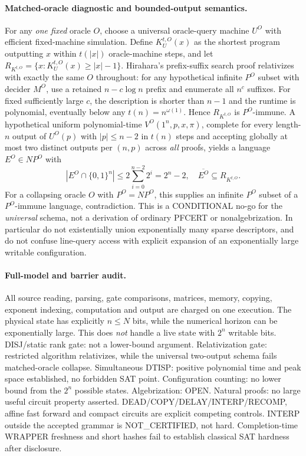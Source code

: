 \documentclass[11pt]{article}
\begin{document}
\paragraph{Matched-oracle diagnostic and bounded-output semantics.}
For any \emph{one fixed} oracle $O$, choose a universal oracle-query machine $U^O$ with efficient fixed-machine simulation. Define $K_{U}^{t,O}(x)$ as the shortest program outputting $x$ within $t(|x|)$ oracle-machine steps, and let $R_{K^{t,O}}=\{x:K_{U}^{t,O}(x)\ge |x|-1\}$. Hirahara's prefix-suffix search proof relativizes with exactly the same $O$ throughout: for any hypothetical infinite $P^O$ subset with decider $M^O$, use a retained $n-c\log n$ prefix and enumerate all $n^c$ suffixes. For fixed sufficiently large $c$, the description is shorter than $n-1$ and the runtime is polynomial, eventually below any $t(n)=n^{\omega(1)}$. Hence $R_{K^{t,O}}$ is $P^O$-immune. A hypothetical uniform polynomial-time $V^O(1^n,p,x,\pi)$, complete for every length-$n$ output of $U^O(p)$ with $|p|\le n-2$ in $t(n)$ steps and accepting globally at most two distinct outputs per $(n,p)$ across \emph{all} proofs, yields a language $E^O\in NP^O$ with
\[
|E^O\cap\{0,1\}^n|\le2\sum_{i=0}^{n-2}2^i=2^n-2,\quad
\overline{E^O}\subseteq R_{K^{t,O}}.
\]
For a collapsing oracle $O$ with $P^O=NP^O$, this supplies an infinite $P^O$ subset of a $P^O$-immune language, contradiction. This is a CONDITIONAL no-go for the \emph{universal} schema, not a derivation of ordinary PFCERT or nonalgebrization. In particular do not existentially union exponentially many sparse descriptors, and do not confuse line-query access with explicit expansion of an exponentially large writable configuration.

\paragraph{Full-model and barrier audit.}
All source reading, parsing, gate comparisons, matrices, memory, copying, exponent indexing, computation and output are charged on one execution. The physical state has explicitly $n\le N$ bits, while the numerical horizon can be exponentially large. This does \emph{not} handle a live state with $2^n$ writable bits. DISJ/static rank gate: not a lower-bound argument. Relativization gate: restricted algorithm relativizes, while the universal two-output schema fails matched-oracle collapse. Simultaneous DTISP: positive polynomial time and peak space established, no forbidden SAT point. Configuration counting: no lower bound from the $2^n$ possible states. Algebrization: OPEN. Natural proofs: no large useful circuit property asserted. DEAD/COPY/DELAY/INTERP/RECOMP, affine fast forward and compact circuits are explicit competing controls. INTERP outside the accepted grammar is NOT_CERTIFIED, not hard. Completion-time WRAPPER freshness and short hashes fail to establish classical SAT hardness after disclosure.
\end{document}
